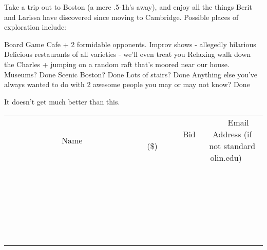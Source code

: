 \documentclass[11pt]{article}
\begin{document}
Take a trip out to Boston (a mere .5-1h's away), and enjoy all the things Berit and Larissa have discovered since moving to Cambridge. Possible places of exploration include:

Board Game Cafe + 2 formidable opponents. 
Improv shows - allegedly hilarious 
Delicious restaurants of all varieties - we'll even treat you
Relaxing walk down the Charles + jumping on a random raft that's moored near our house. 
Museums? Done
Scenic Boston? Done
Lots of stairs? Done
Anything else you've always wanted to do with 2 awesome people you may or may not know? Done

It doesn't get much better than this.
\\[6ex]
\begin{tabular}{c c c}
~~~~~~~~~~~~~Name~~~~~~~~~~~~~ & ~~~~~~~~~Bid (\$)~~~~~~~~~  & ~~~Email Address (if not standard olin.edu)~~~\\
 & & \\
\hline
 & & \\
\hline
 & & \\
\hline
 & & \\
\hline
 & & \\
\hline
 & & \\
\hline
 & & \\
\hline
 & & \\
\hline
 & & \\
\hline
 & & \\
\hline
 & & \\
\hline
 & & \\
\hline
 & & \\
\hline
 & & \\
\hline
 & & \\
\hline
 & & \\
\hline
 & & \\
\hline
 & & \\
\hline
 & & \\
\hline
 & & \\
\hline
 & & \\
\hline
 & & \\
\hline
 & & \\
\hline
 & & \\
\hline
 & & \\
\hline
 & & \\
\hline
\end{tabular}
\newpage
\end{document}
